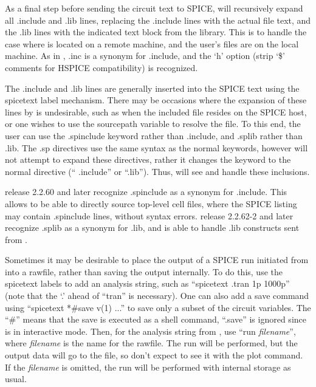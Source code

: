 As a final step before sending the circuit text to SPICE, {\Xic} will
recursively expand all {\vt .include} and {\vt .lib} lines, replacing
the {\vt .include} lines with the actual file text, and the {\vt .lib}
lines with the indicated text block from the library.  This is to
handle the case where {\WRspice} is located on a remote machine, and
the user's files are on the local machine.  As in {\WRspice}, {\vt
.inc} is a synonym for {\vt .include}, and the `{\vt h}' option (strip
`\$' comments for HSPICE compatibility) is recognized.
 
The {\vt .include} and {\vt .lib} lines are generally inserted into
the SPICE text using the {\vt spicetext} label mechanism.  There may
be occasions where the expansion of these lines by {\Xic} is
undesirable, such as when the included file resides on the SPICE host,
or one wishes to use the {\WRspice} {\vt sourcepath} variable to
resolve the file.  To this end, the user can use the {\vt .spinclude}
keyword rather than {\vt .include}, and {\vt .splib} rather than {\vt
.lib}.  The {\vt .sp} directives use the same syntax as the normal
keywords, however {\Xic} will not attempt to expand these directives,
rather it changes the keyword to the normal directive (``{\vt
.include}'' or ``{\vt .lib}'').  Thus, {\WRspice} will see and handle
these inclusions.

{\WRspice} release 2.2.60 and later recognize {\vt .spinclude} as a
synonym for {\vt .include}.  This allows {\WRspice} to be able to
directly source top-level cell files, where the SPICE listing may
contain {\vt .spinclude} lines, without syntax errors.  {\WRspice}
release 2.2.62-2 and later recognize {\vt .splib} as a synonym for
{\vt .lib}, and is able to handle {\vt .lib} constructs sent from
{\Xic}.

Sometimes it may be desirable to place the output of a SPICE run
initiated from {\Xic} into a rawfile, rather than saving the output
internally.  To do this, use the {\vt spicetext} labels to add an
analysis string, such as ``{\vt spicetext .tran 1p 1000p}'' (note that
the `.' ahead of ``tran'' is necessary).  One can also add a save
command using ``{\vt spicetext *\#save v(1) ...}'' to save only a
subset of the circuit variables.  The ``{\vt *\#}'' means that the
save is executed as a shell command, ``{\vt .save}'' is ignored since
{\WRspice} is in interactive mode.  Then, for the analysis string from
{\Xic}, use ``{\vt run} {\it filename\/}'',
where {\it filename\/} is the name for the rawfile.  The run will be
performed, but the output data will go to the file, so don't expect to
see it with the {\cb plot} command.  If the {\it filename\/} is
omitted, the run will be performed with internal storage as usual.

